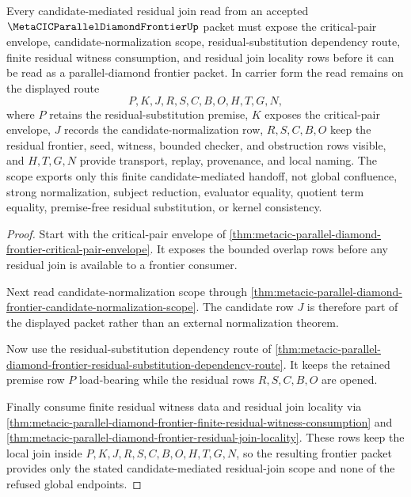 \begin{theorem}
\label{thm:metacic-parallel-diamond-candidate-mediated-residual-join-scope}
Every candidate-mediated residual join read from an accepted $\MetaCICParallelDiamondFrontierUp$ packet must expose the critical-pair envelope, candidate-normalization scope, residual-substitution dependency route, finite residual witness consumption, and residual join locality rows before it can be read as a parallel-diamond frontier packet. In carrier form the read remains on the displayed route
$$
P,K,J,R,S,C,B,O,H,T,G,N ,
$$
where $P$ retains the residual-substitution premise, $K$ exposes the critical-pair envelope, $J$ records the candidate-normalization row, $R,S,C,B,O$ keep the residual frontier, seed, witness, bounded checker, and obstruction rows visible, and $H,T,G,N$ provide transport, replay, provenance, and local naming. The scope exports only this finite candidate-mediated handoff, not global confluence, strong normalization, subject reduction, evaluator equality, quotient term equality, premise-free residual substitution, or kernel consistency.
\end{theorem}
\begin{proof}
Start with the critical-pair envelope of \autoref{thm:metacic-parallel-diamond-frontier-critical-pair-envelope}. It exposes the bounded overlap rows before any residual join is available to a frontier consumer.

Next read candidate-normalization scope through \autoref{thm:metacic-parallel-diamond-frontier-candidate-normalization-scope}. The candidate row $J$ is therefore part of the displayed packet rather than an external normalization theorem.

Now use the residual-substitution dependency route of \autoref{thm:metacic-parallel-diamond-frontier-residual-substitution-dependency-route}. It keeps the retained premise row $P$ load-bearing while the residual rows $R,S,C,B,O$ are opened.

Finally consume finite residual witness data and residual join locality via \autoref{thm:metacic-parallel-diamond-frontier-finite-residual-witness-consumption} and \autoref{thm:metacic-parallel-diamond-frontier-residual-join-locality}. These rows keep the local join inside $P,K,J,R,S,C,B,O,H,T,G,N$, so the resulting frontier packet provides only the stated candidate-mediated residual-join scope and none of the refused global endpoints.
\end{proof}

